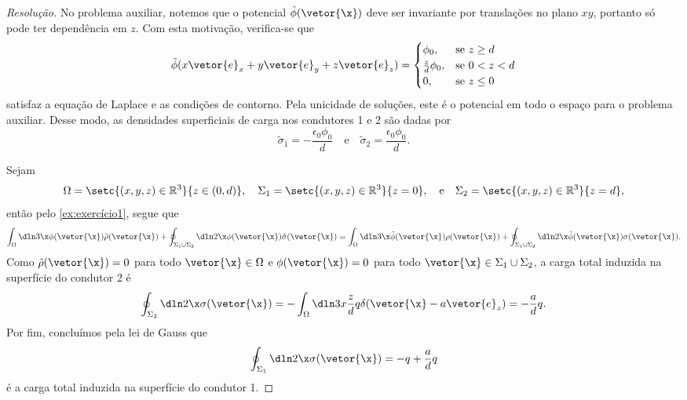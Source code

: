 \begin{proof}[Resolução]
    No problema auxiliar, notemos que o potencial \(\tilde{\phi}(\vetor{\x})\) deve ser invariante por translações no plano \(xy\), portanto só pode ter dependência em \(z\). Com esta motivação, verifica-se que
    \begin{equation*}
        \tilde{\phi}(x \vetor{e}_x + y\vetor{e}_y + z\vetor{e}_z) = \begin{cases}
            \phi_0,&\text{se }z \geq d\\
            \frac{z}{d}\phi_0,&\text{se }0 < z < d\\
            0,&\text{se }z\leq 0
        \end{cases}
    \end{equation*}
    satisfaz a equação de Laplace e as condições de contorno. Pela unicidade de soluções, este é o potencial em todo o espaço para o problema auxiliar. Desse modo, as densidades superficiais de carga nos condutores 1 e 2 são dadas por
    \begin{equation*}
        \tilde{\sigma}_1 = -\frac{\epsilon_0 \phi_0}{d}
        \quad\text{e}\quad
        \tilde{\sigma}_2 = \frac{\epsilon_0 \phi_0}{d}.
    \end{equation*}

    Sejam
    \begin{equation*}
        \Omega = \setc{(x,y,z) \in \mathbb{R}^3}{z \in (0, d)},
        \quad
        \Sigma_1 = \setc{(x,y,z) \in \mathbb{R}^3}{z = 0},
        \quad\text{e}\quad
        \Sigma_2 = \setc{(x,y,z) \in \mathbb{R}^3}{z = d},
    \end{equation*}
    então pelo \cref{ex:exercício1}, segue que
    \begin{equation*}
        \int_{\Omega}\dln3\x \phi(\vetor{\x}) \tilde{\rho}(\vetor{\x}) + \oint_{\Sigma_1 \cup \Sigma_2}\dln2\x \phi(\vetor{\x})\tilde{\sigma}(\vetor{\x}) = \int_{\Omega}\dln3\x \tilde{\phi}(\vetor{\x})\rho(\vetor{\x}) + \oint_{\Sigma_1 \cup \Sigma_2} \dln2\x \tilde{\phi}(\vetor{\x})\sigma(\vetor{\x}).
    \end{equation*}
    Como \(\tilde{\rho}(\vetor{\x}) = 0\) para todo \(\vetor{\x} \in \Omega\) e \(\phi(\vetor{\x}) = 0\) para todo \(\vetor{\x} \in \Sigma_1 \cup \Sigma_2\), a carga total induzida na superfície do condutor 2 é
    \begin{equation*}
        \oint_{\Sigma_2} \dln2\x \sigma(\vetor{\x}) = -\int_{\Omega}\dln3x \frac{z}{d} q \delta(\vetor{\x} - a\vetor{e}_z) = -\frac{a}{d}q.
    \end{equation*}
    Por fim, concluímos pela lei de Gauss que
    \begin{equation*}
        \oint_{\Sigma_1} \dln2\x \sigma(\vetor{\x}) = -q + \frac{a}{d}q
    \end{equation*}
    é a carga total induzida na superfície do condutor 1.
\end{proof}
